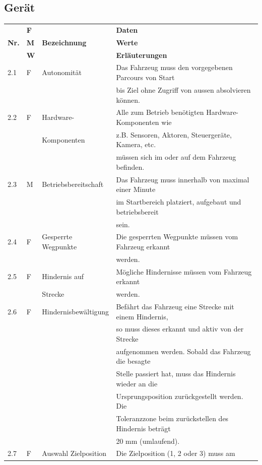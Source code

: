 \documentclass[../main.tex]{subfiles}
\begin{document}
\subsection{Gerät}
\begin{tabular}{|l|l|l|l|}
  \hline
  & \textbf{F} & & \textbf{Daten} \\
  \textbf{Nr.} & \textbf{M} & \textbf{Bezeichnung} & \textbf{Werte} \\
  & \textbf{W} & & \textbf{Erläuterungen} \\
  \hline
  2.1 & F & Autonomität & Das Fahrzeug muss den vorgegebenen Parcours
  von Start \\
  & & & bis Ziel ohne Zugriff von aussen absolvieren können. \\
  \hline
  2.2 & F & Hardware- & Alle zum Betrieb benötigten Hardware-Komponenten wie \\
  & & Komponenten & z.B. Sensoren, Aktoren, Steuergeräte, Kamera, etc. \\
  & & & müssen sich im oder auf dem Fahrzeug befinden. \\
  \hline
  2.3 & M & Betriebsbereitschaft & Das Fahrzeug muss innerhalb von
  maximal einer Minute \\
  & & & im Startbereich platziert, aufgebaut und betriebsbereit \\
  & & & sein. \\
  \hline
  2.4 & F &  Gesperrte Wegpunkte & Die gesperrten Wegpunkte müssen
  vom Fahrzeug erkannt \\
  & & & werden. \\
  \hline
  2.5 & F & Hindernis auf & Mögliche Hindernisse müssen vom Fahrzeug erkannt \\
  & & Strecke & werden. \\
  \hline
  2.6 & F & Hindernisbewältigung & Befährt das Fahrzeug eine Strecke
  mit einem Hindernis, \\
  & & & so muss dieses erkannt und aktiv von der Strecke \\
  & & & aufgenommen werden. Sobald das Fahrzeug die besagte \\
  & & & Stelle passiert hat, muss das Hindernis wieder an die \\
  & & & Ursprungsposition zurückgestellt werden. Die \\
  & & & Toleranzzone beim zurückstellen des Hindernis beträgt \\
  & & & 20 mm (umlaufend). \\
  \hline
  2.7 & F & Auswahl Zielposition & Die Zielposition (1, 2 oder 3) muss am

\end{tabular}
\end{document}
